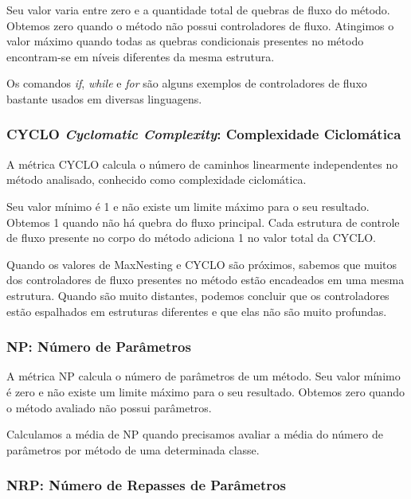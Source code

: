 Seu valor varia entre zero e a quantidade total de quebras de fluxo do método. Obtemos zero quando o método não possui controladores de fluxo. Atingimos o valor máximo quando todas as quebras condicionais presentes no método encontram-se em níveis diferentes da mesma estrutura.

Os comandos \textit{if}, \textit{while} e \textit{for} são alguns exemplos de controladores de fluxo bastante usados em diversas linguagens.
                         

\subsubsection{CYCLO \textit{Cyclomatic Complexity}: Complexidade Ciclomática}

A métrica CYCLO \citep{McCabe76} calcula o número de caminhos linearmente independentes no método analisado, conhecido como complexidade ciclomática.

Seu valor mínimo é 1 e não existe um limite máximo para o seu resultado. Obtemos 1 quando não há quebra do fluxo principal. Cada estrutura de controle de fluxo presente no corpo do método adiciona 1 no valor total da CYCLO.
	                          
Quando os valores de MaxNesting e CYCLO são próximos, sabemos que muitos dos controladores de fluxo presentes no método estão encadeados em uma mesma estrutura. Quando são muito distantes, podemos concluir que os controladores estão espalhados em estruturas diferentes e que elas não são muito profundas.
                                   

\subsubsection{NP: Número de Parâmetros}

A métrica NP calcula o número de parâmetros de um método. Seu valor mínimo é zero e não existe um limite máximo para o seu resultado. Obtemos zero quando o método avaliado não possui parâmetros.
                                                             
Calculamos a média de NP quando precisamos avaliar a média do número de parâmetros por método de uma determinada classe.	   
                                   

\subsubsection{NRP: Número de Repasses de Parâmetros}

